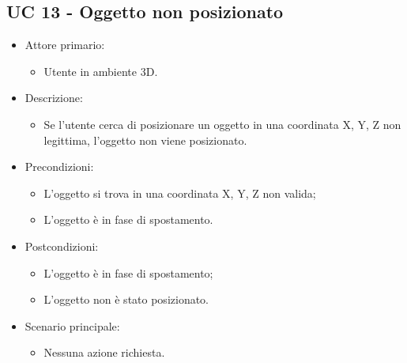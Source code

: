 \subsection{UC 13 - Oggetto non posizionato}
\begin{itemize}

	\item Attore primario: 
	\begin{itemize}
		\item Utente in ambiente 3D.
	\end{itemize}
	\item Descrizione:
	\begin{itemize}
		\item Se l'utente cerca di posizionare un oggetto in una coordinata X, Y, Z non legittima, l'oggetto non viene posizionato.
	\end{itemize}
	
	\item Precondizioni:
	\begin{itemize}
		\item L'oggetto si trova in una coordinata X, Y, Z non valida;
		\item L'oggetto è in fase di spostamento.
	\end{itemize}
	
	\item Postcondizioni:
	\begin{itemize}
		\item L'oggetto è in fase di spostamento;
		\item L'oggetto non è stato posizionato.
	\end{itemize}
	
	\item Scenario principale:
	\begin{itemize}
		\item Nessuna azione richiesta.
	\end{itemize}
	
\end{itemize}

\pagebreak

